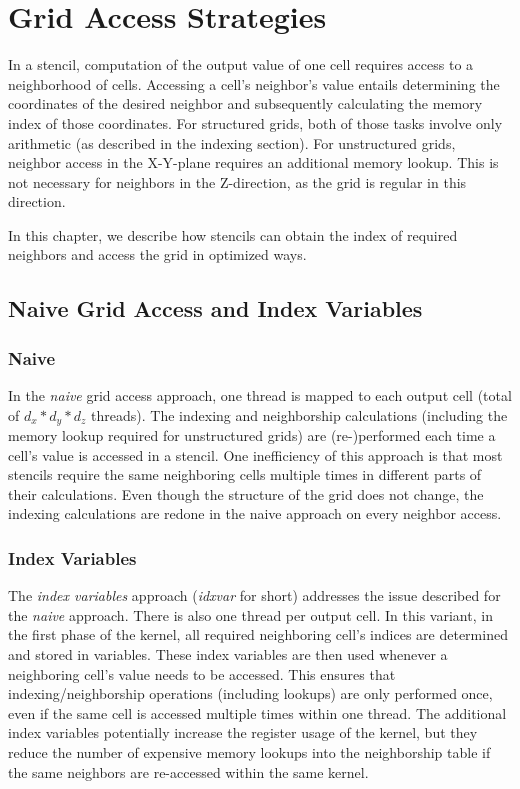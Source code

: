 \chapter{Grid Access Strategies} \label{sec:optimizations}

In a stencil, computation of the output value of one cell requires access to a neighborhood of cells. Accessing a cell's neighbor's value entails determining the coordinates of the desired neighbor and subsequently calculating the memory index of those coordinates. For structured grids, both of those tasks involve only arithmetic (as described in the indexing section). For unstructured grids, neighbor access in the X-Y-plane requires an additional memory lookup. This is not necessary for neighbors in the Z-direction, as the grid is regular in this direction.

In this chapter, we describe how stencils can obtain the index of required neighbors and access the grid in optimized ways.

\section{Naive Grid Access and Index Variables}

\subsection{Naive} In the \emph{naive} grid access approach, one thread is mapped to each output cell (total of $d_x*d_y*d_z$ threads). The indexing and neighborship calculations (including the memory lookup required for unstructured grids) are (re-)performed each time a cell's value is accessed in a stencil.  One inefficiency of this approach is that most stencils require the same neighboring cells multiple times in different parts of their calculations. Even though the structure of the grid does not change, the indexing calculations are redone in the naive approach on every neighbor access.

\subsection{Index Variables} The \emph{index variables} approach (\emph{idxvar} for short) addresses the issue described for the \emph{naive} approach. There is also one thread per output cell. In this variant, in the first phase of the kernel, all required neighboring cell's indices are determined and stored in variables. These index variables are then used whenever a neighboring cell's value needs to be accessed. This ensures that indexing/neighborship operations (including lookups) are only performed once, even if the same cell is accessed multiple times within one thread. The additional index variables potentially increase the register usage of the kernel, but they reduce the number of expensive memory lookups into the neighborship table if the same neighbors are re-accessed within the same kernel.

